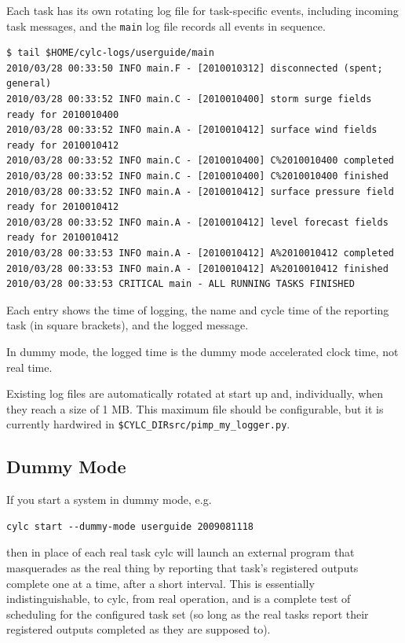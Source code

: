 \documentclass[11pt,a4paper]{article}
\begin{document}
Each task has its own rotating log file for task-specific events,
including incoming task messages, and the \lstinline=main= log file
records all events in sequence.

\begin{lstlisting}
$ tail $HOME/cylc-logs/userguide/main
2010/03/28 00:33:50 INFO main.F - [2010010312] disconnected (spent; general)
2010/03/28 00:33:52 INFO main.C - [2010010400] storm surge fields ready for 2010010400
2010/03/28 00:33:52 INFO main.A - [2010010412] surface wind fields ready for 2010010412
2010/03/28 00:33:52 INFO main.C - [2010010400] C%2010010400 completed
2010/03/28 00:33:52 INFO main.C - [2010010400] C%2010010400 finished
2010/03/28 00:33:52 INFO main.A - [2010010412] surface pressure field ready for 2010010412
2010/03/28 00:33:52 INFO main.A - [2010010412] level forecast fields ready for 2010010412
2010/03/28 00:33:53 INFO main.A - [2010010412] A%2010010412 completed
2010/03/28 00:33:53 INFO main.A - [2010010412] A%2010010412 finished
2010/03/28 00:33:53 CRITICAL main - ALL RUNNING TASKS FINISHED
\end{lstlisting}


Each entry shows the time of logging, the name and cycle time of the
reporting task (in square brackets), and the logged message.

In dummy mode, the logged time is the dummy mode accelerated clock time, not 
real time.

Existing log files are automatically rotated at start up and,
individually, when they reach a size of 1 MB.  This maximum file 
should be configurable, but it is currently hardwired in
\lstinline=$CYLC_DIRsrc/pimp_my_logger.py=.

\subsection{Dummy Mode} 
\label{DummyMode}

If you start a system in dummy mode, e.g.\:

\begin{lstlisting}
cylc start --dummy-mode userguide 2009081118
\end{lstlisting}

then in place of each real task cylc will launch an external program
that masquerades as the real thing by reporting that task's registered
outputs complete one at a time, after a short interval. This is
essentially indistinguishable, to cylc, from real operation, and is a
complete test of scheduling for the configured task set (so long as the
real tasks report their registered outputs completed as they are
supposed to). 
\end{document}

